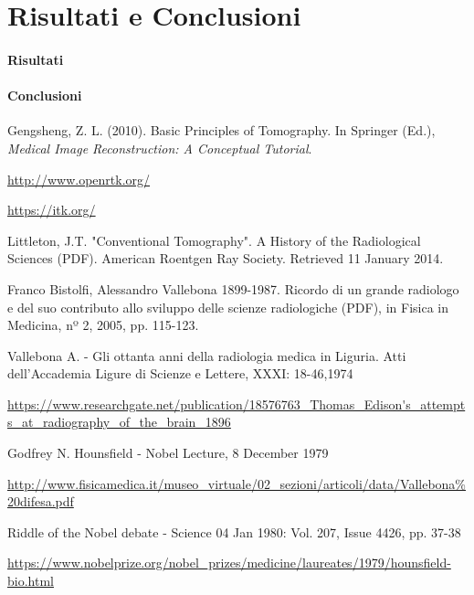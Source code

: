\documentclass[a4paper,11pt, oneside]{article}
\begin{document}
    \part{Risultati e Conclusioni}
        \subsection{Risultati}
        \subsection{Conclusioni}



\newpage
\begin{thebibliography}{1}
        Gengsheng, Z. L. (2010). Basic Principles of Tomography. In Springer (Ed.), \textit{Medical Image Reconstruction: A Conceptual Tutorial}.
        
        \url{http://www.openrtk.org/}
    
        \url{https://itk.org/}
    
        Littleton, J.T. "Conventional Tomography". A History of the Radiological Sciences (PDF). American Roentgen Ray Society. Retrieved 11 January 2014.
    
        Franco Bistolfi, Alessandro Vallebona 1899-1987. Ricordo di un grande radiologo e del suo contributo allo sviluppo delle scienze radiologiche (PDF), in Fisica in Medicina, nº 2, 2005, pp. 115-123.
        
        Vallebona A. - Gli ottanta anni della radiologia medica in Liguria. Atti dell’Accademia Ligure di Scienze e Lettere, XXXI: 18-46,1974
        
        \url{https://www.researchgate.net/publication/18576763_Thomas_Edison's_attempts_at_radiography_of_the_brain_1896}
        
        Godfrey N. Hounsfield - Nobel Lecture, 8 December 1979
        
        \url{http://www.fisicamedica.it/museo_virtuale/02_sezioni/articoli/data/Vallebona%20difesa.pdf}
        
        Riddle of the Nobel debate - Science 04 Jan 1980: Vol. 207, Issue 4426, pp. 37-38
        
        \url{https://www.nobelprize.org/nobel_prizes/medicine/laureates/1979/hounsfield-bio.html}
        
        
    \end{thebibliography}
\end{document}
